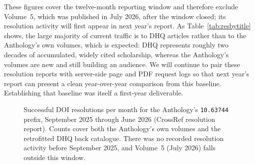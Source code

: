 \documentclass[11pt]{article}
\begin{document}
These figures cover the twelve-month reporting window and therefore exclude Volume~5, which was published in July 2026, after the window closed; its resolution activity will first appear in next year's report. As Table~\ref{tab:resbytitle} shows, the large majority of current traffic is to DHQ articles rather than to the Anthology's own volumes, which is expected: DHQ represents roughly two decades of accumulated, widely cited scholarship, whereas the Anthology's volumes are new and still building an audience. We will continue to pair these resolution reports with server-side page and PDF request logs so that next year's report can present a clean year-over-year comparison from this baseline. Establishing that baseline was itself a first-year deliverable.

\begin{figure}[h]
\centering
{}
\caption{Successful DOI resolutions per month for the Anthology's \texttt{10.63744} prefix, September 2025 through June 2026 (CrossRef resolution report). Counts cover both the Anthology's own volumes and the retrofitted DHQ back catalogue. There was no recorded resolution activity before September 2025, and Volume~5 (July 2026) falls outside this window.}
\label{fig:resolutions}
\end{figure}
\end{document}
